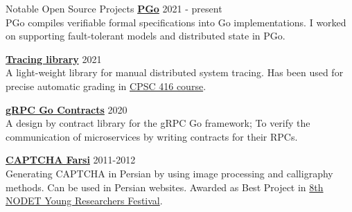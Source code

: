 \documentclass{resume} %
\begin{document}
\begin{rSection}{Notable Open Source Projects}
	{\bf \href{https://github.com/UBC-NSS/pgo}{PGo}} \hfill 2021 - present
	\\PGo compiles verifiable formal specifications into Go implementations. I worked on supporting fault-tolerant models and distributed state in PGo.

	{\bf \href{https://github.com/DistributedClocks/tracing}{Tracing library}} \hfill 2021
	\\A light-weight library for manual distributed system tracing. Has been used for precise automatic grading in \href{https://www.cs.ubc.ca/~bestchai/teaching/cs416_2020w2/index.html}{CPSC 416 course}.

    {\bf \href{https://github.com/shayanh/grpc-go-contracts}{gRPC Go Contracts}} \hfill 2020
    \\A design by contract library for the gRPC Go framework; To verify the communication of microservices by writing contracts for their RPCs.


	{\bf \href{https://github.com/KhassTeam/Persian-CAPTCHA}{CAPTCHA Farsi}} \hfill 2011-2012
	\\Generating CAPTCHA in Persian by using image processing and calligraphy methods. Can be used in Persian websites. Awarded as Best Project in
	\href{https://www.helli.ir/portal/content/%D8%AA%D9%82%D8%AF%DB%8C%D8%B1-%D8%A7%D8%B2-%D8%AF%D8%A7%D9%86%D8%B4-%D8%A2%D9%85%D9%88%D8%B2%D8%A7%D9%86-%D8%A8%D8%B1%D8%AA%D8%B1%D9%BE%DA%98%D9%88%D9%87%D8%B4%DA%AF%D8%B1}
		{8th NODET Young Researchers Festival}.
\end{rSection}
\end{document}
